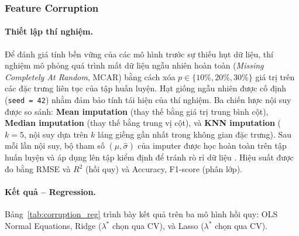 \subsubsection{Feature Corruption}

\paragraph{Thiết lập thí nghiệm.}
Để đánh giá tính bền vững của các mô hình trước sự thiếu hụt dữ liệu,
thí nghiệm mô phỏng quá trình mất dữ liệu ngẫu nhiên hoàn toàn
(\textit{Missing Completely At Random}, MCAR) bằng cách xóa $p \in \{10\%, 20\%, 30\%\}$
giá trị trên các đặc trưng liên tục của tập huấn luyện.
Hạt giống ngẫu nhiên được cố định (\texttt{seed = 42}) nhằm đảm bảo
tính tái hiện của thí nghiệm.
Ba chiến lược nội suy được so sánh:
\textbf{Mean imputation} (thay thế bằng giá trị trung bình cột),
\textbf{Median imputation} (thay thế bằng trung vị cột),
và \textbf{KNN imputation} ($k=5$, nội suy dựa trên $k$ láng giềng gần nhất trong
không gian đặc trưng).
Sau mỗi lần nội suy, bộ tham số $(\hat{\mu}, \hat{\sigma})$ của imputer
được học hoàn toàn trên tập huấn luyện và áp dụng lên tập kiểm định
để tránh rò rỉ dữ liệu .
Hiệu suất được đo bằng RMSE và $R^2$ (hồi quy) và Accuracy, F1-score
(phân lớp).

\paragraph{Kết quả – Regression.}
Bảng~\ref{tab:corruption_reg} trình bày kết quả trên ba mô hình hồi quy:
OLS Normal Equations, Ridge ($\lambda^*$ chọn qua CV), và Lasso ($\lambda^*$ chọn qua CV).


